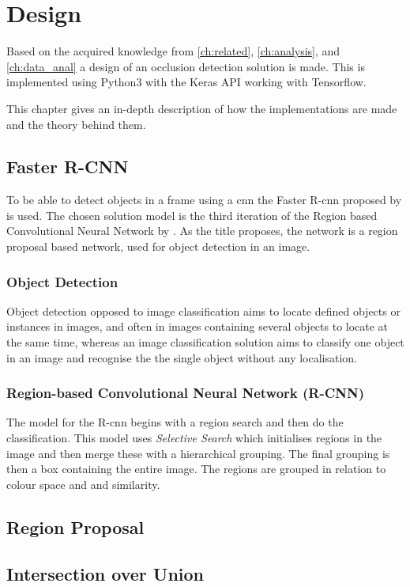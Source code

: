 \graphicspath{{figures/design/}}
\chapter{Design}\label{ch:design}
Based on the acquired knowledge from \autoref{ch:related}, \autoref{ch:analysis}, and \autoref{ch:data_anal} a design of an occlusion detection solution is made. This is implemented using Python3 with the Keras API working with Tensorflow.

This chapter gives an in-depth description of how the implementations are made and the theory behind them.
\section{Faster R-CNN}
To be able to detect objects in a frame using a \gls{cnn} the Faster R-\gls{cnn} proposed by \cite{frcnn} is used. The chosen solution model is the third iteration of the Region based Convolutional Neural Network by \cite{rcnn}. As the title proposes, the network is a region proposal based network, used for object detection in an image.

\subsection{Object Detection}
Object detection opposed to image classification aims to locate defined objects or instances in images, and often in images containing several objects to locate at the same time, whereas an image classification solution aims to classify one object in an image and recognise the the single object without any localisation.

\subsection{Region-based Convolutional Neural Network (R-CNN)} 
The model for the R-\gls{cnn} begins with a region search and then do the classification. This model uses \textit{Selective Search} which initialises regions in the image and then merge these with a hierarchical grouping. The final grouping is then a box containing the entire image. The regions are grouped in relation to colour space and and similarity.

\section{Region Proposal}

\section{Intersection over Union}
